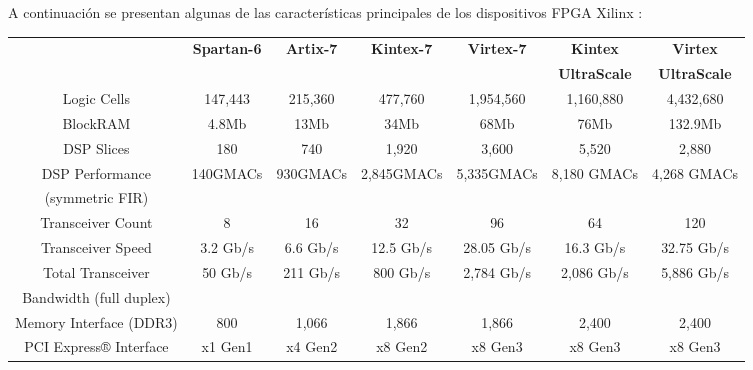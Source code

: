 \newpage

A continuación se presentan algunas de las características principales de los dispositivos FPGA Xilinx \cite{XilinxFPGA}:

\begin{table}[h!]
   \begin{center}
      \scriptsize
      \begin{tabular}{|c|c|c|c|c|c|c|}
         \hline          
                        & \textbf{Spartan-6} & \textbf{Artix-7} & \textbf{Kintex-7} & \textbf{Virtex-7} & \textbf{Kintex} & \textbf{Virtex}\\
                        &                    &                  &                   &                   & \textbf{UltraScale} & \textbf{UltraScale} \\ \hline \hline
         Logic Cells             & 147,443     & 215,360     & 477,760     & 1,954,560   & 1,160,880   & 4,432,680   \\ \hline
         BlockRAM                & 4.8Mb       & 13Mb        & 34Mb        & 68Mb        & 76Mb        & 132.9Mb     \\ \hline
         DSP Slices              & 180         & 740         & 1,920       & 3,600       & 5,520       & 2,880       \\ \hline
         DSP Performance         & 140GMACs    & 930GMACs    & 2,845GMACs  & 5,335GMACs  & 8,180 GMACs & 4,268 GMACs \\ 
         (symmetric FIR)         &             &             &             &             &             &             \\ \hline
         Transceiver Count       & 8           & 16          & 32          & 96          & 64          & 120         \\ \hline
         Transceiver Speed       & 3.2 Gb/s    & 6.6 Gb/s    & 12.5 Gb/s   & 28.05 Gb/s  & 16.3 Gb/s   & 32.75 Gb/s  \\ \hline
         Total Transceiver       & 50 Gb/s     & 211 Gb/s    & 800 Gb/s    & 2,784 Gb/s  & 2,086 Gb/s  & 5,886 Gb/s  \\ 
         Bandwidth (full duplex) &             &             &             &             &             &             \\ \hline
         Memory Interface (DDR3) & 800         & 1,066       & 1,866       & 1,866       & 2,400       & 2,400       \\ \hline
         PCI Express® Interface  & x1 Gen1     & x4 Gen2     & x8 Gen2     & x8 Gen3     & x8 Gen3     & x8 Gen3     \\ \hline

\end{tabular}
\end{center}
\end{table}
